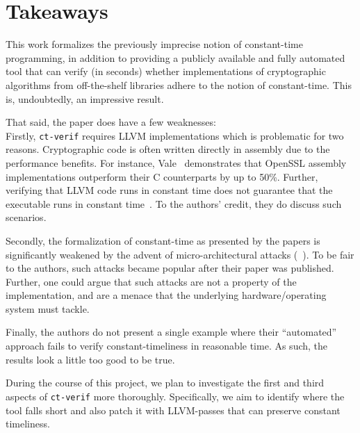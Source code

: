 \section{Takeaways}

This work formalizes the previously imprecise notion of constant-time programming, in addition to providing a publicly available and fully automated tool that can verify (in seconds) whether implementations of cryptographic algorithms from off-the-shelf libraries adhere to the notion of constant-time. 
This is, undoubtedly, an impressive result.

That said, the paper does have a few weaknesses: \\
\indent Firstly, \texttt{ct-verif} requires LLVM implementations which is problematic for two reasons.
Cryptographic code is often written directly in assembly due to the performance benefits. For instance, Vale~\cite{vale} demonstrates that OpenSSL assembly implementations outperform their C counterparts by up to 50\%.
Further, verifying that LLVM code runs in constant time does not guarantee that the executable runs in constant time~\cite{KaufmannPVV16}. To the authors' credit, they do discuss such scenarios.

Secondly, the formalization of constant-time as presented by the papers is significantly weakened by the advent of micro-architectural attacks (~\cite{meltdown, spectre}). To be fair to the authors, such attacks became popular after their paper was published. Further, one could argue that such attacks are not a property of the implementation, and are a menace that the underlying hardware/operating system must tackle.

Finally, the authors do not present a single example where their ``automated'' approach fails to verify constant-timeliness in reasonable time. As such, the results look a little too good to be true. 

During the course of this project, we plan to investigate the first and third aspects of \texttt{ct-verif} more thoroughly. 
Specifically, we aim to identify where the tool falls short and also patch it with LLVM-passes that can preserve constant timeliness. 